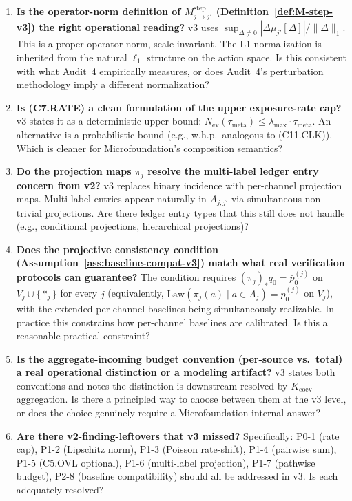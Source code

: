 \documentclass{article}
\newcommand{\Nev}{N_{\mathrm{ev}}}
\newcommand{\lammax}{\lambda_{\max}}
\newcommand{\taumeta}{\tau_{\mathrm{meta}}}
\begin{document}
\begin{enumerate}
\item \textbf{Is the operator-norm definition of
  $M_{j \to j'}^{\mathrm{step}}$
  (Definition~\ref{def:M-step-v3}) the right operational reading?}
  v3 uses $\sup_{\Delta \neq 0} |\Delta\mu_{j'}[\Delta]|/\|\Delta\|_1$.
  This is a proper operator norm, scale-invariant.  The L1
  normalization is inherited from the natural $\ell_1$ structure
  on the action space.  Is this consistent with what Audit~4
  empirically measures, or does Audit~4's perturbation methodology
  imply a different normalization?

\item \textbf{Is (C7.RATE) a clean formulation of the upper
  exposure-rate cap?}  v3 states it as a deterministic upper
  bound: $\Nev(\taumeta) \leq \lammax \cdot \taumeta$.  An
  alternative is a probabilistic bound (e.g., w.h.p.\ analogous to
  (C11.CLK)).  Which is cleaner for Microfoundation's composition
  semantics?

\item \textbf{Do the projection maps $\pi_j$ resolve the multi-label
  ledger entry concern from v2?}  v3 replaces binary incidence with
  per-channel projection maps.  Multi-label entries appear
  naturally in $A_{j, j'}$ via simultaneous non-trivial
  projections.  Are there ledger entry types that this still does
  not handle (e.g., conditional projections, hierarchical
  projections)?

\item \textbf{Does the projective consistency condition
  (Assumption~\ref{ass:baseline-compat-v3}) match what real
  verification protocols can guarantee?}  The condition requires
  $(\pi_j)_* q_0 = \bar{p}_0^{(j)}$ on $V_j \cup \{*_j\}$ for
  every $j$ (equivalently, $\mathrm{Law}(\pi_j(a) \mid a \in A_j)
  = p_0^{(j)}$ on $V_j$), with the extended per-channel baselines
  being simultaneously realizable.  In practice this constrains
  how per-channel baselines are calibrated.  Is this a reasonable
  practical constraint?

\item \textbf{Is the aggregate-incoming budget convention
  (per-source vs.\ total) a real operational distinction or a
  modeling artifact?}  v3 states both conventions and notes the
  distinction is downstream-resolved by $K_{\mathrm{coev}}$
  aggregation.  Is there a principled way to choose between them
  at the v3 level, or does the choice genuinely require a
  Microfoundation-internal answer?

\item \textbf{Are there v2-finding-leftovers that v3 missed?}
  Specifically: P0-1 (rate cap), P1-2 (Lipschitz norm), P1-3
  (Poisson rate-shift), P1-4 (pairwise sum), P1-5 (C5.OVL
  optional), P1-6 (multi-label projection), P1-7 (pathwise
  budget), P2-8 (baseline compatibility) should all be addressed
  in v3.  Is each adequately resolved?
\end{enumerate}
\end{document}
